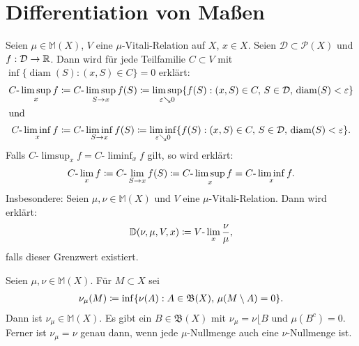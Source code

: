 \documentclass[a4paper,twoside,DIV15,BCOR12mm]{scrbook}
\newcommand{\borel}{\mathfrak B}
\DeclareMathOperator{\diam}{diam}
\newcommand{\downto}{\mathrel\searrow}
\newcommand{\MR}{\lfloor}
\begin{document}
\section{Differentiation von Maßen}

\begin{definition}
Seien $\mu\in\mathbb{M} (X)$, $V$ eine $\mu$-Vitali-Relation auf $X$, $x\in X$. Seien $\mathcal{D}\subset \mathcal P(X)$ und $f:\mathcal D\to \mathbb{R}$. Dann wird für jede Teilfamilie $C\subset V$ mit $\inf\{\diam(S): (x,S)\in C\}=0$ erklärt:
\begin{align*}
C\text{-}\limsup_x f &\da C\text{-}\limsup_{S\to x} f(S) \da
\limsup_{\ep \downto 0}\{f(S):(x,S)\in C,\, S\in\mathcal D,\, \diam(S)<\ep\}\\
\intertext{und}
C\text{-}\liminf_x f &\da C\text{-}\liminf_{S\to x} f(S) \da
\liminf_{\ep \downto 0}\{f(S):(x,S)\in C,\, S\in\mathcal D,\, \diam(S)<\ep\}.
\end{align*}
Falls $C\text{-}\limsup_x f = C\text{-}\liminf_x f$ gilt, so wird erklärt:
\begin{align*}
C\text{-}\lim_x f \da C\text{-}\lim_{S\to x} f(S)\da C\text{-}\limsup_x f = C\text{-}\liminf_x f.
\end{align*}
Insbesondere: Seien $\mu,\nu\in\mathbb M(X)$ und $V$ eine $\mu$-Vitali-Relation. Dann wird erklärt:
\begin{align*}
\mathbb D(\nu,\mu,V,x) \da V\text{-}\lim_x \frac\nu\mu,
\end{align*}
falls dieser Grenzwert existiert.
\end{definition}

\begin{satz}
\label{satz:2.10}
Seien $\mu,\nu\in\mathbb{M}(X)$. Für $M\subset X$ sei
\begin{align*}
\nu_\mu(M) \da \inf\{\nu(A) : A\in \borel(X),\, \mu(M\setminus A) =0 \}.
\end{align*}
Dann ist $\nu_\mu\in\mathbb{M} (X)$. Es gibt ein $B\in\borel(X)$ mit $\nu_\mu = \nu\MR B$ und $\mu(B^c) = 0$. Ferner ist $\nu_\mu=\nu$ genau dann, wenn jede $\mu$-Nullmenge auch eine $\nu$-Nullmenge ist.
\end{satz}
\end{document}
